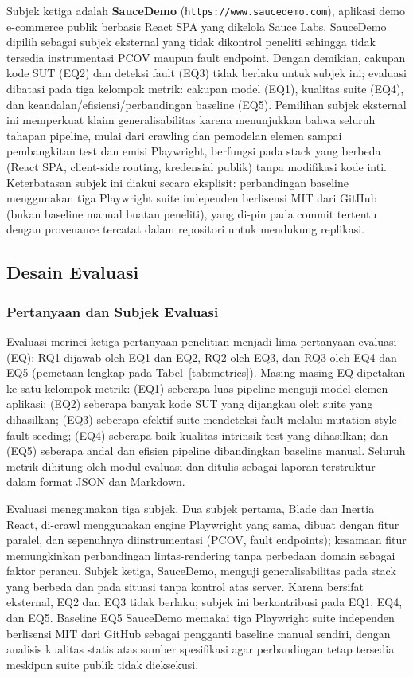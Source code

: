 \documentclass[conference]{IEEEtran}
\begin{document}
Subjek ketiga adalah \textbf{SauceDemo} (\texttt{https://www.saucedemo.com}), aplikasi demo e-commerce publik berbasis React SPA yang dikelola Sauce Labs. SauceDemo dipilih sebagai subjek eksternal yang tidak dikontrol peneliti sehingga tidak tersedia instrumentasi PCOV maupun fault endpoint. Dengan demikian, cakupan kode SUT (EQ2) dan deteksi fault (EQ3) tidak berlaku untuk subjek ini; evaluasi dibatasi pada tiga kelompok metrik: cakupan model (EQ1), kualitas suite (EQ4), dan keandalan/efisiensi/perbandingan baseline (EQ5). Pemilihan subjek eksternal ini memperkuat klaim generalisabilitas karena menunjukkan bahwa seluruh tahapan pipeline, mulai dari crawling dan pemodelan elemen sampai pembangkitan test dan emisi Playwright, berfungsi pada stack yang berbeda (React SPA, client-side routing, kredensial publik) tanpa modifikasi kode inti. Keterbatasan subjek ini diakui secara eksplisit: perbandingan baseline menggunakan tiga Playwright suite independen berlisensi MIT dari GitHub (bukan baseline manual buatan peneliti), yang di-pin pada commit tertentu dengan provenance tercatat dalam repositori untuk mendukung replikasi.

\subsection{Desain Evaluasi}
\label{subsec:desain-eval}

\subsubsection{Pertanyaan dan Subjek Evaluasi}

Evaluasi merinci ketiga pertanyaan penelitian menjadi lima pertanyaan evaluasi (EQ): RQ1 dijawab oleh EQ1 dan EQ2, RQ2 oleh EQ3, dan RQ3 oleh EQ4 dan EQ5 (pemetaan lengkap pada Tabel~\ref{tab:metrics}). Masing-masing EQ dipetakan ke satu kelompok metrik: (EQ1) seberapa luas pipeline menguji model elemen aplikasi; (EQ2) seberapa banyak kode SUT yang dijangkau oleh suite yang dihasilkan; (EQ3) seberapa efektif suite mendeteksi fault melalui mutation-style fault seeding; (EQ4) seberapa baik kualitas intrinsik test yang dihasilkan; dan (EQ5) seberapa andal dan efisien pipeline dibandingkan baseline manual. Seluruh metrik dihitung oleh modul evaluasi dan ditulis sebagai laporan terstruktur dalam format JSON dan Markdown.

Evaluasi menggunakan tiga subjek. Dua subjek pertama, Blade dan Inertia React, di-crawl menggunakan engine Playwright yang sama, dibuat dengan fitur paralel, dan sepenuhnya diinstrumentasi (PCOV, fault endpoints); kesamaan fitur memungkinkan perbandingan lintas-rendering tanpa perbedaan domain sebagai faktor perancu. Subjek ketiga, SauceDemo, menguji generalisabilitas pada stack yang berbeda dan pada situasi tanpa kontrol atas server. Karena bersifat eksternal, EQ2 dan EQ3 tidak berlaku; subjek ini berkontribusi pada EQ1, EQ4, dan EQ5. Baseline EQ5 SauceDemo memakai tiga Playwright suite independen berlisensi MIT dari GitHub sebagai pengganti baseline manual sendiri, dengan analisis kualitas statis atas sumber spesifikasi agar perbandingan tetap tersedia meskipun suite publik tidak dieksekusi.
\end{document}
